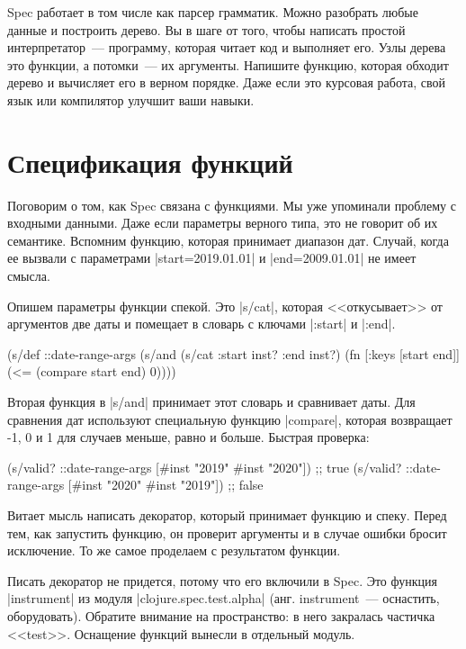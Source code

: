 Spec работает в том числе как парсер грамматик. Можно разобрать любые данные и
построить дерево. Вы в шаге от того, чтобы написать простой интерпретатор~---
программу, которая читает код и выполняет его. Узлы дерева это функции, а
потомки~--- их аргументы. Напишите функцию, которая обходит дерево и вычисляет
его в верном порядке. Даже если это курсовая работа, свой язык или компилятор
улучшит ваши навыки.

\section{Спецификация функций}

Поговорим о том, как Spec связана с функциями. Мы уже упоминали проблему с
входными данными. Даже если параметры верного типа, это не говорит об их
семантике. Вспомним функцию, которая принимает диапазон дат. Случай, когда ее
вызвали с параметрами \spverb|start=2019.01.01| и \spverb|end=2009.01.01| не
имеет смысла.

Опишем параметры функции спекой. Это \spverb|s/cat|, которая <<откусывает>> от
аргументов две даты и помещает в словарь с ключами \spverb|:start| и
\spverb|:end|.

\begin{english}
  \begin{clojure}
(s/def ::date-range-args
  (s/and
   (s/cat :start inst? :end inst?)
   (fn [{:keys [start end]}]
     (<= (compare start end) 0))))
  \end{clojure}
\end{english}

Вторая функция в \spverb|s/and| принимает этот словарь и сравнивает даты. Для
сравнения дат используют специальную функцию \spverb|compare|, которая возвращает
-1, 0 и 1 для случаев меньше, равно и больше. Быстрая проверка:

\begin{english}
  \begin{clojure}
(s/valid? ::date-range-args [#inst "2019" #inst "2020"]) ;; true
(s/valid? ::date-range-args [#inst "2020" #inst "2019"]) ;; false
  \end{clojure}
\end{english}

Витает мысль написать декоратор, который принимает функцию и спеку. Перед тем,
как запустить функцию, он проверит аргументы и в случае ошибки бросит
исключение. То же самое проделаем с результатом функции.

Писать декоратор не придется, потому что его включили в Spec. Это функция
\spverb|instrument| из модуля \spverb|clojure.spec.test.alpha|
(анг. instrument~--- оснастить, оборудовать). Обратите внимание на пространство:
в него закралась частичка <<test>>. Оснащение функций вынесли в отдельный
модуль.

